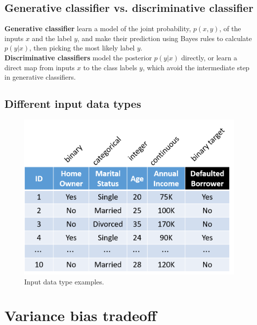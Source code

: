 \begin{refsection}
\subsection{Generative classifier vs. discriminative classifier }\cite{jordan2002discriminative}
\textbf{Generative classifier} learn a model of the joint probability, $p(x,y)$, of the inputs $x$ and the label $y$, and make their prediction using Bayes rules to calculate $p(y|x)$, then picking the most likely label $y$.\\
\textbf{Discriminative classifiers} model the posterior $p(y|x)$ directly, or learn a direct map from inputs $x$ to the class labels $y$, which avoid the intermediate step in generative classifiers. 

\subsection{Different input data types}

\begin{figure}[H]
\centering
\includegraphics[width=0.5\linewidth]{../figures/statisticalLearning/supervisedLearningPrinciples/SupervisedLearningClassificationDataTypeExample}
\caption{Input data type examples.}
\label{fig:SupervisedLearningClassificationDataTypeExample}
\end{figure}


\section{Variance bias tradeoff}


\end{refsection}
